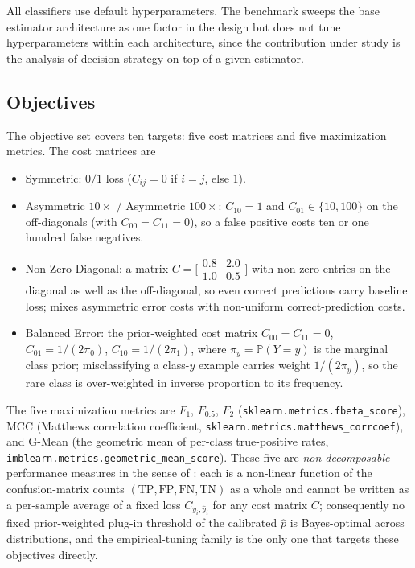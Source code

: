 All classifiers use default hyperparameters. The benchmark sweeps the base estimator architecture as one factor in the design but does not tune hyperparameters within each architecture, since the contribution under study is the analysis of decision strategy on top of a given estimator.

\subsection{Objectives}\label{sec:binary_objectives}
The objective set covers ten targets: five cost matrices and five maximization metrics. The cost matrices are
\begin{itemize}
    \item Symmetric: $0/1$ loss ($C_{ij} = 0$ if $i = j$, else $1$).
    \item Asymmetric $10\times$ / Asymmetric $100\times$: $C_{10} = 1$ and $C_{01} \in \{10, 100\}$ on the off-diagonals (with $C_{00} = C_{11} = 0$), so a false positive costs ten or one hundred false negatives.
    \item Non-Zero Diagonal: a matrix $C = \bigl[\begin{smallmatrix} 0.8 & 2.0 \\ 1.0 & 0.5 \end{smallmatrix}\bigr]$ with non-zero entries on the diagonal as well as the off-diagonal, so even correct predictions carry baseline loss; mixes asymmetric error costs with non-uniform correct-prediction costs.
    \item Balanced Error: the prior-weighted cost matrix $C_{00} = C_{11} = 0$, $C_{01} = 1/(2\pi_0)$, $C_{10} = 1/(2\pi_1)$, where $\pi_y = \mathbb{P}(Y = y)$ is the marginal class prior; misclassifying a class-$y$ example carries weight $1/(2\pi_y)$, so the rare class is over-weighted in inverse proportion to its frequency.
\end{itemize}
The five maximization metrics are $F_1$, $F_{0.5}$, $F_2$ (\texttt{sklearn.\allowbreak metrics.\allowbreak fbeta\_\allowbreak score}), MCC (Matthews correlation coefficient, \texttt{sklearn.\allowbreak metrics.\allowbreak matthews\_\allowbreak corrcoef}), and G-Mean (the geometric mean of per-class true-positive rates, \texttt{imblearn.\allowbreak metrics.\allowbreak geometric\_\allowbreak mean\_\allowbreak score}). These five are \emph{non-decomposable} performance measures in the sense of \citet{narasimhan2015optimizing}: each is a non-linear function of the confusion-matrix counts $(\mathrm{TP}, \mathrm{FP}, \mathrm{FN}, \mathrm{TN})$ as a whole and cannot be written as a per-sample average of a fixed loss $C_{y_i, \hat y_i}$ for any cost matrix $C$; consequently no fixed prior-weighted plug-in threshold of the calibrated $\hat p$ is Bayes-optimal across distributions, and the empirical-tuning family is the only one that targets these objectives directly.

